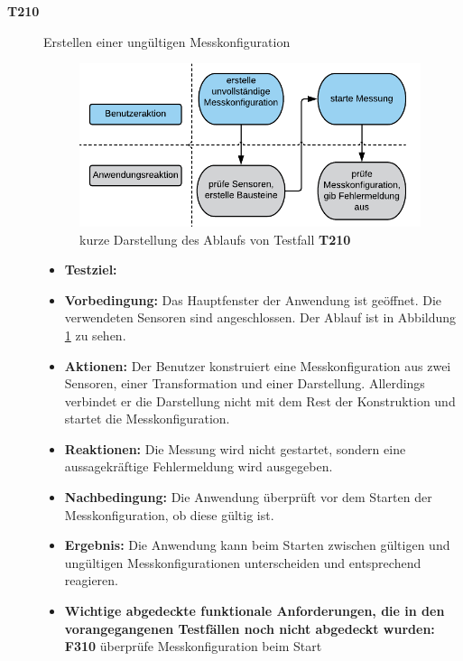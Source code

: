 \documentclass[parskip=full]{scrartcl}
\begin{document}
\begin{description}
\item[\textbf{T210}] Erstellen einer ungültigen Messkonfiguration

\begin{figure}[htbp]
	\begin{center}
		\includegraphics[width = 10cm]{Grafik/T210-Ablauf.png}
		\caption{kurze Darstellung des Ablaufs von Testfall \textbf{T210}}
		\label{T210-Ablauf}
	\end{center}
\end{figure}
\begin{itemize}

\item []\textbf{Testziel:} 

\item []\textbf{Vorbedingung:} Das Hauptfenster der Anwendung ist geöffnet. Die verwendeten Sensoren sind angeschlossen. Der Ablauf ist in Abbildung \ref{T210-Ablauf} zu sehen.

\item []\textbf{Aktionen:} Der Benutzer konstruiert eine Messkonfiguration aus zwei Sensoren, einer Transformation und einer Darstellung. Allerdings verbindet er die Darstellung nicht mit dem Rest der Konstruktion und startet die Messkonfiguration.
\item []\textbf{Reaktionen:} Die Messung wird nicht gestartet, sondern eine aussagekräftige Fehlermeldung wird ausgegeben.
\item []\textbf{Nachbedingung:} Die Anwendung überprüft vor dem Starten der Messkonfiguration, ob diese gültig ist.

\item []\textbf{Ergebnis:} Die Anwendung kann beim Starten zwischen gültigen und ungültigen Messkonfigurationen unterscheiden und entsprechend reagieren.
\item []\textbf{Wichtige abgedeckte funktionale Anforderungen, die in den vorangegangenen Testfällen noch nicht abgedeckt wurden:} \textbf{F310} überprüfe Messkonfiguration beim Start

\end{itemize}


\end{description}
\end{document}
